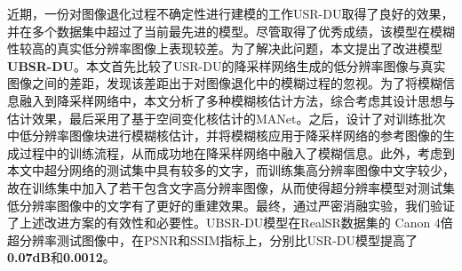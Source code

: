 近期，一份对图像退化过程不确定性进行建模的工作USR-DU取得了良好的效果，并在多个数据集中超过了当前最先进的模型。尽管取得了优秀成绩，该模型在模糊性较高的真实低分辨率图像上表现较差。为了解决此问题，本文提出了改进模型\textbf{UBSR-DU}。本文首先比较了USR-DU的降采样网络生成的低分辨率图像与真实图像之间的差距，发现该差距出于对图像退化中的模糊过程的忽视。为了将模糊信息融入到降采样网络中，本文分析了多种模糊核估计方法，综合考虑其设计思想与估计效果，最后采用了基于空间变化核估计的MANet。之后，设计了对训练批次中低分辨率图像块进行模糊核估计，并将模糊核应用于降采样网络的参考图像的生成过程中的训练流程，从而成功地在降采样网络中融入了模糊信息。此外，考虑到本文中超分网络的测试集中具有较多的文字，而训练集高分辨率图像中文字较少，故在训练集中加入了若干包含文字高分辨率图像，从而使得超分辨率模型对测试集低分辨率图像中的文字有了更好的重建效果。最终，通过严密消融实验，我们验证了上述改进方案的有效性和必要性。UBSR-DU模型在RealSR数据集的 Canon 4倍超分辨率测试图像中，在PSNR和SSIM指标上，分别比USR-DU模型提高了\textbf{0.07dB}和\textbf{0.0012}。
